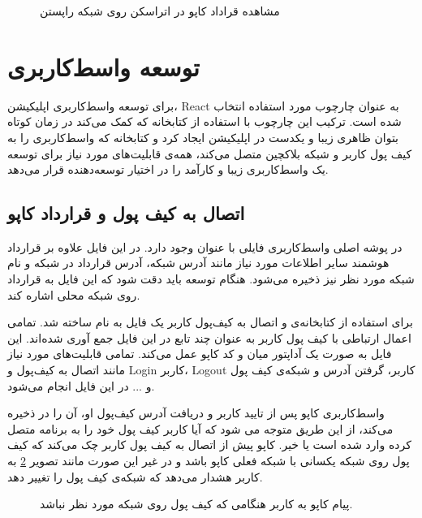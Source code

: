 \begin{figure}
\centerline{}
\caption{مشاهده قراداد کاپو در اتراسکن روی شبکه راپستن}
\label{fig:etherscan}
\end{figure}


\section{توسعه واسط‌کاربری}
برای توسعه واسط‌کاربری اپلیکیشن،
\gls{React}
به عنوان چارچوب مورد استفاده انتخاب شده است.
ترکیب این چارچوب با استفاده از کتابخانه
که کمک می‌کند در زمان کوتاه بتوان ظاهری زیبا و یکدست در اپلیکیشن ایجاد کرد و کتابخانه
که واسط‌کاربری را به کیف پول کاربر و شبکه بلاکچین متصل می‌کند،
همه‌ی قابلیت‌های مورد نیاز برای توسعه یک واسط‌کاربری زیبا و کارآمد را در اختیار توسعه‌دهنده قرار می‌دهد.

\subsection{اتصال به کیف پول و قرارداد کاپو}
در پوشه اصلی واسط‌کاربری فایلی با عنوان
وجود دارد.
در این فایل علاوه بر
قرارداد هوشمند سایر اطلاعات مورد نیاز مانند آدرس شبکه،
آدرس قرارداد در شبکه و نام شبکه مورد نظر نیز ذخیره می‌شود.
هنگام توسعه باید دقت شود که این فایل به قرارداد روی شبکه محلی اشاره کند.

برای استفاده از کتابخانه‌ی
و اتصال به کیف‌پول کاربر یک فایل به نام
ساخته شد.
تمامی اعمال ارتباطی با کیف پول کاربر به عنوان چند تابع در این فایل جمع آوری شده‌اند.
این فایل به صورت یک آداپتور میان
و کد کاپو عمل می‌کند. تمامی قابلیت‌های مورد نیاز مانند اتصال به کیف‌پول و
\gls{Login}
کاربر،
\gls{Logout}
کاربر، گرفتن آدرس و شبکه‌ی کیف پول و ... در این فایل انجام می‌شود.

واسط‌کاربری کاپو پس از تایید کاربر و دریافت آدرس کیف‌پول او، آن را در
ذخیره می‌کند،
از این طریق متوجه می شود که آیا کاربر کیف پول خود را به برنامه متصل کرده وارد شده است یا خیر.
کاپو پیش از اتصال به کیف پول کاربر چک می‌کند که کیف پول روی شبکه یکسانی با شبکه فعلی کاپو باشد
و در غیر این صورت مانند تصویر
\ref{fig:cappu-wrong-network-error}
به کاربر هشدار می‌دهد که شبکه‌ی کیف پول را تغییر دهد.

\begin{figure}[H]
\centerline{}
\caption{پیام کاپو به کاربر هنگامی که کیف پول روی شبکه مورد نظر نباشد.}
\label{fig:cappu-wrong-network-error}
\end{figure}

